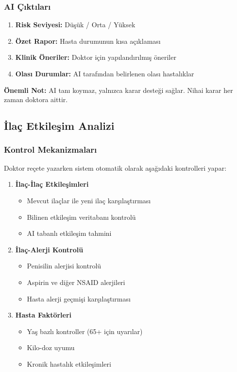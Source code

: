 \documentclass[12pt,a4paper]{article}
\begin{document}
\subsubsection{AI Çıktıları}
\begin{enumerate}
    \item \textbf{Risk Seviyesi:} Düşük / Orta / Yüksek
    \item \textbf{Özet Rapor:} Hasta durumunun kısa açıklaması
    \item \textbf{Klinik Öneriler:} Doktor için yapılandırılmış öneriler
    \item \textbf{Olası Durumlar:} AI tarafından belirlenen olası hastalıklar
\end{enumerate}

\textbf{Önemli Not:} AI tanı koymaz, yalnızca karar desteği sağlar. Nihai karar her zaman doktora aittir.

\subsection{İlaç Etkileşim Analizi}

\subsubsection{Kontrol Mekanizmaları}
Doktor reçete yazarken sistem otomatik olarak aşağıdaki kontrolleri yapar:

\begin{enumerate}
    \item \textbf{İlaç-İlaç Etkileşimleri}
    \begin{itemize}
        \item Mevcut ilaçlar ile yeni ilaç karşılaştırması
        \item Bilinen etkileşim veritabanı kontrolü
        \item AI tabanlı etkileşim tahmini
    \end{itemize}
    
    \item \textbf{İlaç-Alerji Kontrolü}
    \begin{itemize}
        \item Penisilin alerjisi kontrolü
        \item Aspirin ve diğer NSAID alerjileri
        \item Hasta alerji geçmişi karşılaştırması
    \end{itemize}
    
    \item \textbf{Hasta Faktörleri}
    \begin{itemize}
        \item Yaş bazlı kontroller (65+ için uyarılar)
        \item Kilo-doz uyumu
        \item Kronik hastalık etkileşimleri
    \end{itemize}
\end{enumerate}
\end{document}
